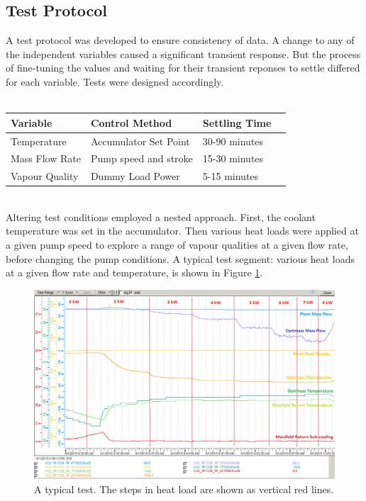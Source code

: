 \documentclass{report}
\begin{document}
\subsection{Test Protocol}
A test protocol was developed to ensure consistency of data. A change to any of the independent variables caused a significant transient response. But the process of fine-tuning the values and waiting for their transient reponses to settle differed for each variable. Tests were designed accordingly.\\\\
\begin{tabular}{|l|l|l|l|}
\textbf{Variable} & \textbf{Control Method} & \textbf{Settling Time}\\\hline
Temperature & Accumulator Set Point & 30-90 minutes\\\hline
Mass Flow Rate & Pump speed and stroke & 15-30 minutes\\\hline
Vapour Quality & Dummy Load Power & 5-15 minutes\\\hline
\end{tabular}
\\
Altering test conditions employed a nested approach. First, the coolant temperature was set in the accumulator. Then various heat loads were applied at a given pump speed to explore a range of vapour qualities at a given flow rate, before changing the pump conditions. A typical test segment: various heat loads at a given flow rate and temperature, is shown in Figure \ref{fig:typicalTest}. 

\begin{figure}
\includegraphics[width=\textwidth]{typicalTest}
\caption{A typical test. The steps in heat load are shown as vertical red lines.}
\label{fig:typicalTest}
\end{figure}
\end{document}
